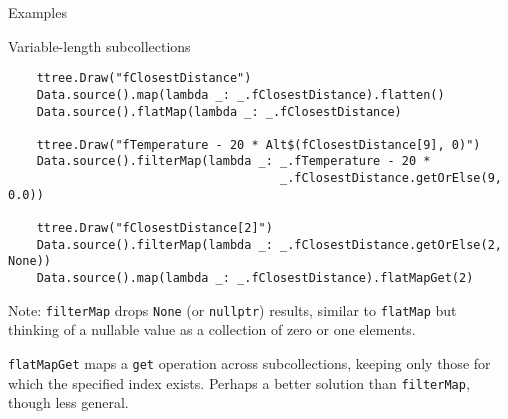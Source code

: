 \documentclass{beamer}
\begin{document}
\begin{frame}[fragile]{Examples}
\begin{block}{Variable-length subcollections}
\vspace{-0.5\baselineskip}
{\scriptsize \begin{verbatim}
    ttree.Draw("fClosestDistance")
    Data.source().map(lambda _: _.fClosestDistance).flatten()
    Data.source().flatMap(lambda _: _.fClosestDistance)

    ttree.Draw("fTemperature - 20 * Alt$(fClosestDistance[9], 0)")
    Data.source().filterMap(lambda _: _.fTemperature - 20 *
                                      _.fClosestDistance.getOrElse(9, 0.0))

    ttree.Draw("fClosestDistance[2]")
    Data.source().filterMap(lambda _: _.fClosestDistance.getOrElse(2, None))
    Data.source().map(lambda _: _.fClosestDistance).flatMapGet(2)
\end{verbatim}}
\vspace{-0.5\baselineskip}
Note: {\tt filterMap} drops {\tt None} (or {\tt nullptr}) results, similar to {\tt flatMap} but thinking of a nullable value as a collection of zero or one elements.

\vspace{0.5\baselineskip}
{\tt flatMapGet} maps a {\tt get} operation across subcollections, keeping only those for which the specified index exists. Perhaps a better solution than {\tt filterMap}, though less general.
\end{block}
\end{frame}
\end{document}

